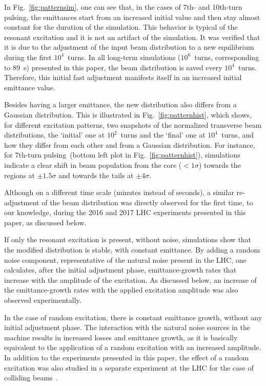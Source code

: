 \documentclass[aps
,prstab
,reprint
,longbibliography
,preprintnumbers
,showkeys
,amsfonts,amssymb,amsmath
,floatfix
]{revtex4-1}
\newcommand{\seventhtp}{7th-turn pulsing}
\newcommand{\tenthtp}{10th-turn pulsing}
\begin{document}
In Fig.~\ref{fig:patternsim}, one can see that, in the cases of 7th-
and \tenthtp, the emittances start from an increased initial value and
then stay almost constant for the duration of the simulation. This
behavior is typical of the resonant excitation and it is not an
artifact of the simulation. It was verified that it is due to the
adjustment of the input beam distribution to a new equilibrium during
the first $10^4$~turns. In all long-term simulations ($10^6$~turns,
corresponding to 89~s) presented in this paper, the beam distribution
is saved every $10^4$~turns. Therefore, this initial fast adjustment
manifests itself in an increased initial emittance value.

Besides having a larger emittance, the new distribution also differs
from a Gaussian distribution.  This is illustrated in
Fig.~\ref{fig:patternhist}, which shows, for different excitation
patterns, two snapshots of the normalized transverse beam
distributions, the `initial' one at $10^2$~turns and the `final' one
at $10^4$~turns, and how they differ from each other and from a
Gaussian distribution. For instance, for \seventhtp\ (bottom left plot
in Fig.~\ref{fig:patternhist}), simulations indicate a clear shift in
beam population from the core ($< 1\sigma$) towards the regions at
$\pm 1.5\sigma$ and towards the tails at $\pm 4\sigma$.

Although on a different time scale (minutes instead of seconds), a
similar re-adjustment of the beam distribution was directly observed
for the first time, to our knowledge, during the 2016 and 2017 LHC
experiments presented in this paper, as discussed below.

If only the resonant excitation is present, without noise, simulations
show that the modified distribution is stable, with constant
emittance. By adding a random noise component, representative of the
natural noise present in the LHC, one calculates, after the initial
adjustment phase, emittance-growth rates that increase with the
amplitude of the excitation. As discussed below, an increase of the
emittance-growth rates with the applied excitation amplitude was also
observed experimentally.

In the case of random excitation, there is constant emittance growth,
without any initial adjustment phase. The interaction with the natural
noise sources in the machine results in increased losses and emittance
growth, as it is basically equivalent to the application of a random
excitation with an increased amplitude. In addition to the experiments
presented in this paper, the effect of a random excitation was also
studied in a separate experiment at the LHC for the case of colliding
beams~\cite{md1433_noise_top_energy, md_noise_bbLHC}.
\end{document}
